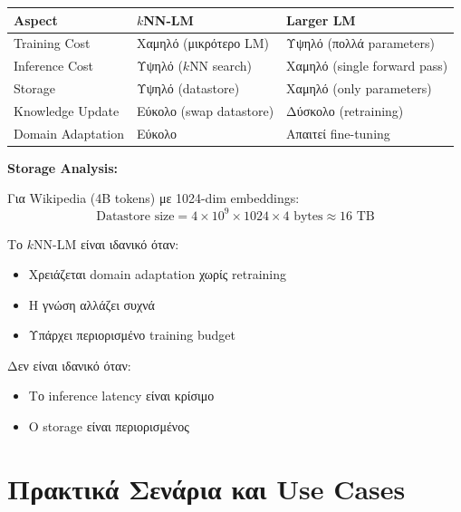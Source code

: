 \begin{center}
\begin{tabular}{p{3.5cm}p{4.5cm}p{4.5cm}}
\toprule
\textbf{Aspect} & \textbf{$k$NN-LM} & \textbf{Larger LM} \\
\midrule
Training Cost & Χαμηλό (μικρότερο LM) & Υψηλό (πολλά parameters) \\
Inference Cost & Υψηλό ($k$NN search) & Χαμηλό (single forward pass) \\
Storage & Υψηλό (datastore) & Χαμηλό (only parameters) \\
Knowledge Update & Εύκολο (swap datastore) & Δύσκολο (retraining) \\
Domain Adaptation & Εύκολο & Απαιτεί fine-tuning \\
\bottomrule
\end{tabular}
\end{center}

\textbf{Storage Analysis:}

Για Wikipedia (4B tokens) με 1024-dim embeddings:
$$\text{Datastore size} = 4 \times 10^9 \times 1024 \times 4 \text{ bytes} \approx 16 \text{ TB}$$

\begin{warningbox}
Το $k$NN-LM είναι ιδανικό όταν:
\begin{itemize}
    \item Χρειάζεται domain adaptation χωρίς retraining
    \item Η γνώση αλλάζει συχνά
    \item Υπάρχει περιορισμένο training budget
\end{itemize}
Δεν είναι ιδανικό όταν:
\begin{itemize}
    \item Το inference latency είναι κρίσιμο
    \item Ο storage είναι περιορισμένος
\end{itemize}
\end{warningbox}


\section{Πρακτικά Σενάρια και Use Cases}

